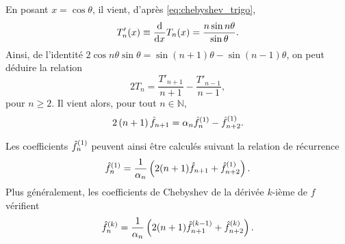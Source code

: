 En posant $x = \cos\theta$, il vient, d'après \eqref{eq:chebyshev_trigo},
\begin{equation}
	T'_n(x) \equiv \dfdx{T_n(x)}{x} = \frac{n \sin n\theta}{\sin \theta}.
\end{equation}
Ainsi, de l'identité $2 \cos n \theta \sin \theta = \sin(n+1)\theta - \sin(n-1)\theta$, on peut déduire la relation 
\begin{equation}
	2 T_n = \frac{T'_{n+1}}{n+1} - \frac{T'_{n-1}}{n-1} ,
\end{equation}
pour $n \geq 2$. Il vient alors, pour tout $n \in \mathbb{N}$,
\begin{equation}
	2 \left( n + 1 \right) \hat{f}_{n+1} = \alpha_n \deriv{\hat{f}}{1}_n - \deriv{\hat{f}}{1}_{n+2}.
\end{equation}

Les coefficients $\deriv{\hat{f}}{1}_n$ peuvent ainsi être calculés suivant la relation de récurrence
\begin{equation}
	\deriv{\hat{f}}{1}_n = 
	\frac{1}{\alpha_n} \left( 2 (n + 1) \hat{f}_{n+1} + \deriv{\hat{f}}{1}_{n+2} \right).
	\label{eq:chebyshev_diff_recurrence}
\end{equation}
Plus généralement, les coefficients de Chebyshev de la dérivée $k$-ième de $f$ vérifient
\begin{equation}
	\deriv{\hat{f}}{k}_n = 
	\frac{1}{\alpha_n} \left( 2 (n + 1) \deriv{\hat{f}}{k-1}_{n+1} + \deriv{\hat{f}}{k}_{n+2} \right).
	\label{eq:chebyshev_diffp_recurrence}
\end{equation}

